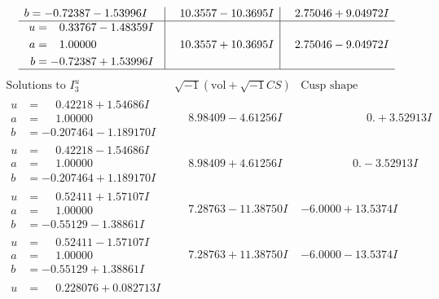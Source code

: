 \documentclass[1p]{elsarticle_modified}
\theoremstyle{definition}
\newcommand{\I}{\sqrt{-1}}
\begin{document}
$$\begin{array}{c|c|c}
\begin{aligned}
b &= -0.72387 - 1.53996 I\end{aligned}
 & \phantom{-}10.3557 - 10.3695 I & \phantom{-}2.75046 + 9.04972 I \\ \hline\begin{aligned}
u &= \phantom{-}0.33767 - 1.48359 I \\
a &= \phantom{-}1.00000\phantom{ +0.000000I} \\
b &= -0.72387 + 1.53996 I\end{aligned}
 & \phantom{-}10.3557 + 10.3695 I & \phantom{-}2.75046 - 9.04972 I\\
 \hline 
 \end{array}$$\newpage$$\begin{array}{c|c|c}  
\text{Solutions to }I^u_{3}& \I (\text{vol} + \sqrt{-1}CS) & \text{Cusp shape}\\
 \hline 
\begin{aligned}
u &= \phantom{-}0.42218 + 1.54686 I \\
a &= \phantom{-}1.00000\phantom{ +0.000000I} \\
b &= -0.207464 - 1.189170 I\end{aligned}
 & \phantom{-}8.98409 - 4.61256 I & \phantom{-0.000000 -}0. + 3.52913 I \\ \hline\begin{aligned}
u &= \phantom{-}0.42218 - 1.54686 I \\
a &= \phantom{-}1.00000\phantom{ +0.000000I} \\
b &= -0.207464 + 1.189170 I\end{aligned}
 & \phantom{-}8.98409 + 4.61256 I & \phantom{-0.000000 } 0. - 3.52913 I \\ \hline\begin{aligned}
u &= \phantom{-}0.52411 + 1.57107 I \\
a &= \phantom{-}1.00000\phantom{ +0.000000I} \\
b &= -0.55129 - 1.38861 I\end{aligned}
 & \phantom{-}7.28763 - 11.38750 I & -6.0000 + 13.5374 I \\ \hline\begin{aligned}
u &= \phantom{-}0.52411 - 1.57107 I \\
a &= \phantom{-}1.00000\phantom{ +0.000000I} \\
b &= -0.55129 + 1.38861 I\end{aligned}
 & \phantom{-}7.28763 + 11.38750 I & -6.0000 - 13.5374 I \\ \hline\begin{aligned}
u &= \phantom{-}0.228076 + 0.082713 I \\

\end{aligned}
\end{array}$$
\end{document}
